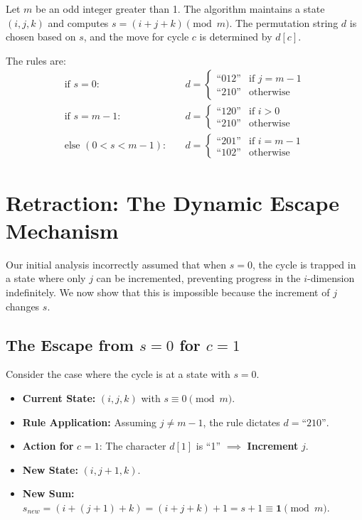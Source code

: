 \documentclass[10pt]{article}
\begin{document}
Let $m$ be an odd integer greater than 1. The algorithm maintains a state $(i, j, k)$ and computes $s = (i + j + k) \pmod m$. The permutation string $d$ is chosen based on $s$, and the move for cycle $c$ is determined by $d[c]$.

The rules are:
\begin{align}
\text{if } s = 0: & \quad d = \begin{cases} \text{``012''} & \text{if } j = m-1 \\ \text{``210''} & \text{otherwise} \end{cases} \\
\text{if } s = m-1: & \quad d = \begin{cases} \text{``120''} & \text{if } i > 0 \\ \text{``210''} & \text{otherwise} \end{cases} \\
\text{else } (0 < s < m-1): & \quad d = \begin{cases} \text{``201''} & \text{if } i = m-1 \\ \text{``102''} & \text{otherwise} \end{cases}
\end{align}

\section{Retraction: The Dynamic Escape Mechanism}

Our initial analysis incorrectly assumed that when $s=0$, the cycle is trapped in a state where only $j$ can be incremented, preventing progress in the $i$-dimension indefinitely. We now show that this is impossible because the increment of $j$ changes $s$.

\subsection{The Escape from $s=0$ for $c=1$}

Consider the case where the cycle is at a state with $s=0$.
\begin{itemize}
    \item \textbf{Current State:} $(i, j, k)$ with $s \equiv 0 \pmod m$.
    \item \textbf{Rule Application:} Assuming $j \neq m-1$, the rule dictates $d = \text{``210''}$.
    \item \textbf{Action for } $c=1$: The character $d[1]$ is ``1'' $\implies$ \textbf{Increment } $j$.
    \item \textbf{New State:} $(i, j+1, k)$.
    \item \textbf{New Sum:} $s_{new} = (i + (j+1) + k) = (i+j+k) + 1 = s + 1 \equiv \mathbf{1} \pmod m$.
\end{itemize}
\end{document}
